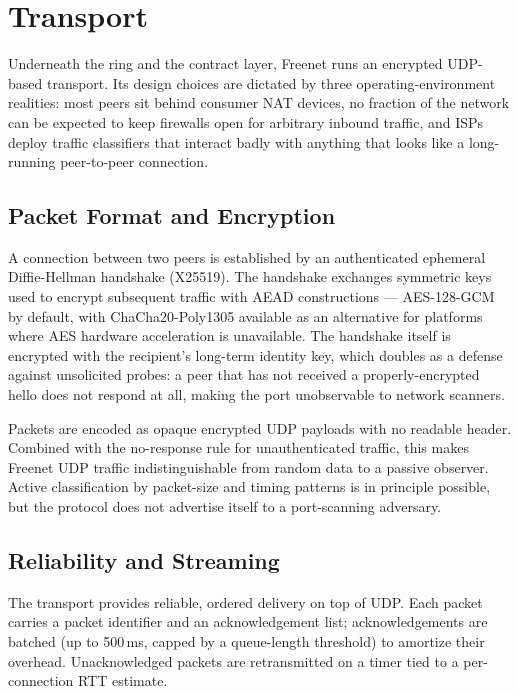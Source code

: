 \section{Transport}
\label{sec:transport}

Underneath the ring and the contract layer, Freenet runs an encrypted UDP-based transport. Its design choices are dictated by three operating-environment realities: most peers sit behind consumer NAT devices, no fraction of the network can be expected to keep firewalls open for arbitrary inbound traffic, and ISPs deploy traffic classifiers that interact badly with anything that looks like a long-running peer-to-peer connection.

\subsection{Packet Format and Encryption}

A connection between two peers is established by an authenticated ephemeral Diffie-Hellman handshake (X25519). The handshake exchanges symmetric keys used to encrypt subsequent traffic with AEAD constructions --- AES-128-GCM by default, with ChaCha20-Poly1305 available as an alternative for platforms where AES hardware acceleration is unavailable. The handshake itself is encrypted with the recipient's long-term identity key, which doubles as a defense against unsolicited probes: a peer that has not received a properly-encrypted hello does not respond at all, making the port unobservable to network scanners.

Packets are encoded as opaque encrypted UDP payloads with no readable header. Combined with the no-response rule for unauthenticated traffic, this makes Freenet UDP traffic indistinguishable from random data to a passive observer. Active classification by packet-size and timing patterns is in principle possible, but the protocol does not advertise itself to a port-scanning adversary.

\subsection{Reliability and Streaming}

The transport provides reliable, ordered delivery on top of UDP. Each packet carries a packet identifier and an acknowledgement list; acknowledgements are batched (up to 500\,ms, capped by a queue-length threshold) to amortize their overhead. Unacknowledged packets are retransmitted on a timer tied to a per-connection RTT estimate.

